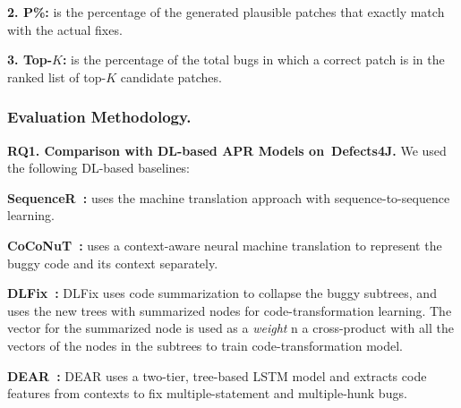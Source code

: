 {\bf 2. P\%:} is the percentage of the generated plausible patches
that exactly match with the actual fixes.

{\bf 3. Top-$K$:} is the percentage of the total bugs in which a correct
patch is in the ranked list of top-$K$ candidate patches.

\subsubsection{Evaluation Methodology.\\}

{\bf RQ1. Comparison with DL-based APR Models on~Defects4J.}  We used
the following DL-based baselines:



{\bf SequenceR~\cite{chen2018sequencer}: } uses the machine
translation approach with sequence-to-sequence learning.

{\bf CoCoNuT~\cite{lutellier2020coconut}:} uses a context-aware neural
machine translation to represent the buggy code and its
context separately.


{\bf DLFix~\cite{icse20}:}
DLFix uses code summarization to collapse the buggy subtrees, and uses the
new trees with summarized nodes for code-transformation learning.
The vector for the summarized node is used as a {\em weight}
n a cross-product with all the vectors of the nodes in the subtrees to
train code-transformation model.

{\bf DEAR~\cite{icse22}:} DEAR uses a two-tier, tree-based LSTM model
and extracts code features from contexts to fix multiple-statement and
multiple-hunk bugs.

